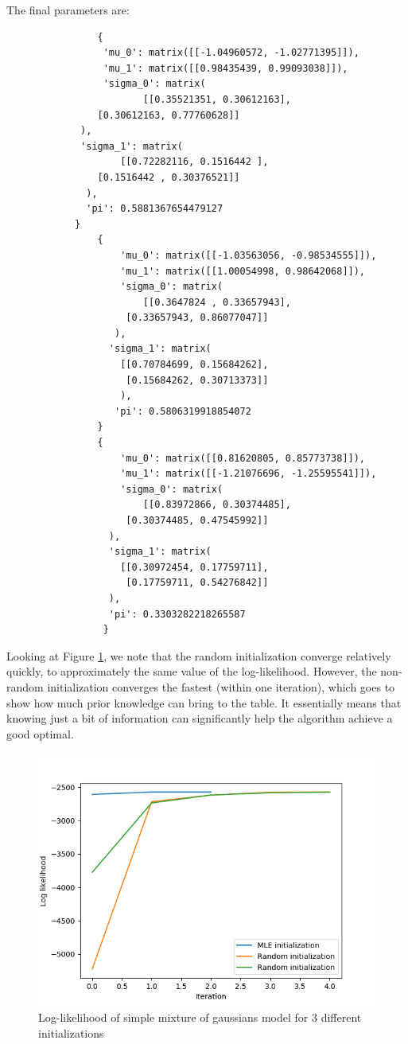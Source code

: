 \documentclass[12pt]{article}
\begin{document}
\begin{enumerate}[label=(\Alph*)]
\begin{enumerate}[label=(\roman*)]
		The final parameters are:
		\begin{verbatim}
				{
				 'mu_0': matrix([[-1.04960572, -1.02771395]]),
				 'mu_1': matrix([[0.98435439, 0.99093038]]),
				 'sigma_0': matrix(
				 		[[0.35521351, 0.30612163],
		        [0.30612163, 0.77760628]]
		     ),
		     'sigma_1': matrix(
		     		[[0.72282116, 0.1516442 ],
		        [0.1516442 , 0.30376521]]
		      ),
		      'pi': 0.5881367654479127
		    }
				{
					'mu_0': matrix([[-1.03563056, -0.98534555]]),
					'mu_1': matrix([[1.00054998, 0.98642068]]),
					'sigma_0': matrix(
						[[0.3647824 , 0.33657943],
				     [0.33657943, 0.86077047]]
				   ),
				  'sigma_1': matrix(
				   	[[0.70784699, 0.15684262],
				     [0.15684262, 0.30713373]]
				    ),
				   'pi': 0.5806319918854072
				}
				{
					'mu_0': matrix([[0.81620805, 0.85773738]]),
					'mu_1': matrix([[-1.21076696, -1.25595541]]),
					'sigma_0': matrix(
						[[0.83972866, 0.30374485],
				     [0.30374485, 0.47545992]]
				  ),
				  'sigma_1': matrix(
				  	[[0.30972454, 0.17759711],
				     [0.17759711, 0.54276842]]
				  ),
				  'pi': 0.3303282218265587
				 }
			\end{verbatim}

			Looking at Figure \ref{fig:2aii}, we note that the random initialization converge relatively quickly, to approximately the same value of the log-likelihood. However, the non-random initialization converges the fastest (within one iteration), which goes to show how much prior knowledge can bring to the table. It essentially means that knowing just a bit of information can significantly help the algorithm achieve a good optimal.

			\begin{figure}[h!]
				\centering
				\includegraphics{starter/2aii.png}
				\caption{Log-likelihood of simple mixture of gaussians model for 3 different initializations}
				\label{fig:2aii}
			\end{figure}


\end{enumerate}
\end{enumerate}
\end{document}
